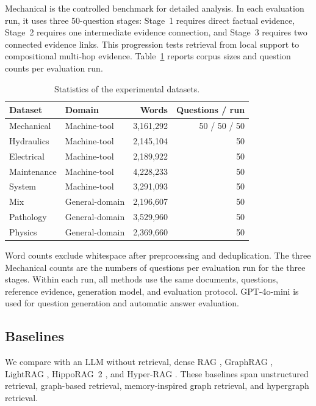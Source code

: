\documentclass{article} %
\begin{document}
Mechanical is the controlled benchmark for detailed analysis. In each evaluation run, it uses three 50-question stages: Stage~1 requires direct factual evidence, Stage~2 requires one intermediate evidence connection, and Stage~3 requires two connected evidence links. This progression tests retrieval from local support to compositional multi-hop evidence. Table~\ref{tab:dataset_statistics} reports corpus sizes and question counts per evaluation run.

\begin{table}[H]
\centering
\caption{Statistics of the experimental datasets.}
\label{tab:dataset_statistics}
\scriptsize
\renewcommand{\arraystretch}{0.92}
\begin{tabular*}{\linewidth}{@{\extracolsep{\fill}}llrr@{}}
\toprule
Dataset & Domain & Words & Questions / run \\
\midrule
Mechanical & Machine-tool & 3,161,292 & 50 / 50 / 50 \\
Hydraulics & Machine-tool & 2,145,104 & 50 \\
Electrical & Machine-tool & 2,189,922 & 50 \\
Maintenance & Machine-tool & 4,228,233 & 50 \\
System & Machine-tool & 3,291,093 & 50 \\
Mix & General-domain & 2,196,607 & 50 \\
Pathology & General-domain & 3,529,960 & 50 \\
Physics & General-domain & 2,369,660 & 50 \\
\bottomrule
\end{tabular*}
\end{table}

Word counts exclude whitespace after preprocessing and deduplication. The three Mechanical counts are the numbers of questions per evaluation run for the three stages. Within each run, all methods use the same documents, questions, reference evidence, generation model, and evaluation protocol. GPT-4o-mini is used for question generation and automatic answer evaluation.

\subsection{Baselines}

We compare with an LLM without retrieval, dense RAG \citep{Karpukhin2020DPR}, GraphRAG \citep{Edge2025GraphRAG}, LightRAG \citep{Guo2025LightRAG}, HippoRAG~2 \citep{Gutierrez2025HippoRAG2}, and Hyper-RAG \citep{Feng2026HyperRAG}. These baselines span unstructured retrieval, graph-based retrieval, memory-inspired graph retrieval, and hypergraph retrieval.
\end{document}
